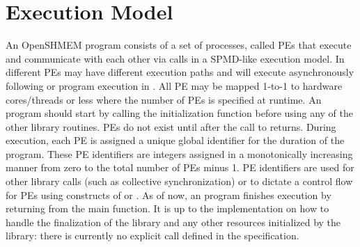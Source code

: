%   
    

\section{Execution Model}
An OpenSHMEM program consists of a set of processes, called \ac{PE}s that execute and communicate with each other via \openshmem calls in a \ac{SPMD}-like execution model. In \openshmem different \ac{PE}s may have different execution paths and will execute asynchronously following \Fortran{} or program execution in \Clang.  All \ac{PE} may be mapped 1-to-1 to hardware cores/threads or less where the number of \ac{PE}s  is specified at runtime. An \openshmem program should start by calling the initialization function   before using any of the other \openshmem library routines. \ac{PE}s do not exist until after the call to  returns. During execution, each \ac{PE} is assigned a unique global identifier for the duration of the program. These \ac{PE} identifiers are integers assigned in a monotonically increasing manner from zero to the total number of \ac{PE}s minus 1. \ac{PE} identifiers are used for other \openshmem library calls (such as collective synchronization) or to dictate a control flow for \ac{PE}s using constructs of \Clang{} or \Fortran. 
As of now, an \openshmem program finishes execution by returning from the main function. 
It is up to the implementation on how to handle the finalization of the
\openshmem library and any other resources initialized by the library:
there is currently no explicit call defined in the \openshmem specification.

